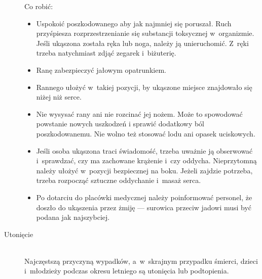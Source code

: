 \documentclass[a5paper,10pt,titlepage,twoside]{article}
\begin{document}
\begin{description}
Co robić:
\begin{itemize}
\item Uspokoić poszkodowanego aby jak najmniej się poruszał. Ruch przyśpiesza rozprzestrzenianie się substancji toksycznej w~organizmie. Jeśli ukąszona została ręka lub noga, należy ją unieruchomić. Z~ręki trzeba natychmiast zdjąć zegarek i~biżuterię.
\item Ranę zabezpieczyć jałowym opatrunkiem.
\item Rannego ułożyć w~takiej pozycji, by ukąszone miejsce znajdowało się niżej niż serce.
\item Nie wysysać rany ani nie rozcinać jej nożem. Może to spowodować powstanie nowych uszkodzeń i sprawić dodatkowy ból poszkodowanemu. Nie wolno też stosować lodu ani opasek uciskowych.
\item Jeśli osoba ukąszona traci świadomość, trzeba uważnie ją obserwować i~sprawdzać, czy ma zachowane krążenie i~czy oddycha. Nieprzytomną należy ułożyć w~pozycji bezpiecznej na boku. Jeżeli zajdzie potrzeba, trzeba rozpocząć sztuczne oddychanie i~masaż serca.
\item Po dotarciu do placówki medycznej należy poinformować personel, że doszło do ukąszenia przez żmiję --- surowica przeciw jadowi musi być podana jak najszybciej.
\end{itemize}
\item[Utonięcie] \hfill \\ Najczęstszą przyczyną wypadków, a~w~skrajnym przypadku śmierci, dzieci i~młodzieży podczas okresu letniego są utonięcia lub podtopienia.


\end{description}
\end{document}
